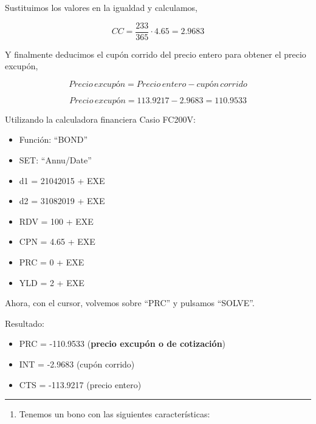 \documentclass[
  letterpaper,
  DIV=11,
  numbers=noendperiod]{scrreprt}
\providecommand{\tightlist}{%
  \setlength{\itemsep}{0pt}\setlength{\parskip}{0pt}}\usepackage{longtable,booktabs,array}
\begin{document}
\begin{tcolorbox}[enhanced jigsaw, left=2mm, opacityback=0, colback=white, breakable, arc=.35mm, bottomrule=.15mm, rightrule=.15mm, toprule=.15mm, leftrule=.75mm, colframe=quarto-callout-tip-color-frame]
\begin{minipage}[t]{\textwidth - 5.5mm}
Sustituimos los valores en la igualdad y calculamos,

\[CC=\frac{233}{365}\cdot 4.65=2.9683\]

Y finalmente deducimos el cupón corrido del precio entero para obtener
el precio excupón,

\[Precio\,excupón = Precio\,entero - cupón\,corrido\]

\[Precio\,excupón = 113.9217 - 2.9683 = 110.9533\]

Utilizando la calculadora financiera Casio FC200V:

\begin{itemize}
\item
  Función: ``BOND''
\item
  SET: ``Annu/Date''
\item
  d1 = 21042015 + EXE
\item
  d2 = 31082019 + EXE
\item
  RDV = 100 + EXE
\item
  CPN = 4.65 + EXE
\item
  PRC = 0 + EXE
\item
  YLD = 2 + EXE
\end{itemize}

Ahora, con el cursor, volvemos sobre ``PRC'' y pulsamos ``SOLVE''.

Resultado:

\begin{itemize}
\item
  PRC = -110.9533 (\textbf{precio excupón o de cotización})
\item
  INT = -2.9683 (cupón corrido)
\item
  CTS = -113.9217 (precio entero)
\end{itemize}

\end{minipage}%
\end{tcolorbox}

\begin{center}\rule{0.5\linewidth}{0.5pt}\end{center}

\begin{enumerate}
\def\labelenumi{\arabic{enumi}.}
\setcounter{enumi}{33}
\tightlist
\item
  Tenemos un bono con las siguientes características:
\end{enumerate}
\end{document}
